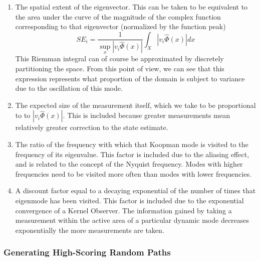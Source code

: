 
\begin{enumerate}
	\item The spatial extent of the eigenvector. This can be taken to be equivalent to the area under the curve of the magnitude of the complex function corresponding to that eigenvector (normalized by the function peak)
	$$ SE_i = \frac{1}{\sup_x |v_i \hat\Phi(x)|} \int_X |v_i \hat\Phi(x)| dx $$
	This Riemman integral can of course be approximated by discretely partitioning the space. From this point of view, we can see that this expression represents what proportion of the domain is subject to variance due to the oscillation of this mode.
	
	\item The expected size of the measurement itself, which we take to be proportional to to $|v_i \hat \Phi(x)|$. This is included because greater measurements mean relatively greater correction to the state estimate.
	
	\item The ratio of the frequency with which that Koopman mode is visited to the frequency of its eigenvalue. This factor is included due to the aliasing effect, and is related to the concept of the Nyquist frequency. Modes with higher frequencies need to be visited more often than modes with lower frequencies.
	
	\item A discount factor equal to a decaying exponential of the number of times that eigenmode has been visited. This factor is included due to the exponential convergence of a Kernel Observer. The information gained by taking a measurement within the active area of a particular dynamic mode decreases exponentially the more measurements are taken.
\end{enumerate}



\subsubsection{Generating High-Scoring Random Paths}

